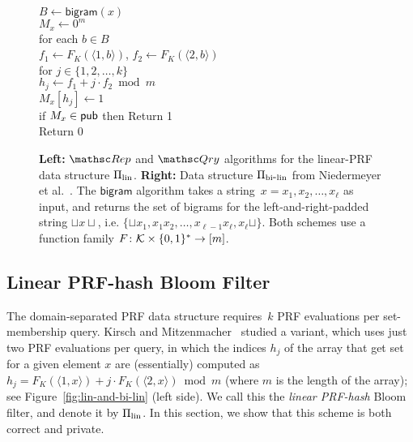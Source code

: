 \begin{figure}[tp]
{\medskip
{}\\
$B \gets \mathsf{bigram}(x)$\\
$M_x \gets 0^m$\\
for each $b \in B$\\
\nudge $f_1 \gets F_{K}(\langle 1,b \rangle)$, $f_2 \gets F_{K}(\langle 2,b \rangle)$\\
\nudge for $j \in \{1, 2, \ldots, k\}$\\
\nudge\nudge $h_j \gets f_1+j\cdot f_2 \bmod m$\\
\nudge\nudge $M_x[h_j] \gets 1$\\
if $M_x \in {\sf pub}$ then Return 1 \\
Return 0
}
\caption{{\bf Left:} $\Rep$ and $\Qry$ algorithms for the linear-PRF
  data structure $\Pi_{\mathrm{lin}}$. {\bf Right:}
Data structure $\Pi_{\mathrm{bi}\mbox{-}\mathrm{lin}}$ from Niedermeyer et
al.~\cite{niedermeyer2014cryptanalysis}.  The $\mathsf{bigram}$
algorithm takes a string~$x=x_1,x_2,\ldots,x_\ell$ as input, and
returns the set of bigrams for the left-and-right-padded string
$\sqcup x \sqcup$, i.e. $\{\sqcup x_1,
x_1x_2,\ldots,x_{\ell-1}x_\ell,x_\ell\sqcup\}$. Both schemes use a
function family $F\colon {\cal K} \times \{0,1\}^* \to [m]$.
}\label{fig:lin-and-bi-lin} \label{fig:niedermeyer}
\end{figure}

\subsection{Linear PRF-hash Bloom Filter }


The domain-separated PRF data structure requires~$k$ PRF evaluations
per set-membership query.  Kirsch and
Mitzenmacher~\cite{kirsch2006less} studied a variant, which uses
just two PRF evaluations per query, in which the indices $h_j$ of
the array that get set for a given element $x$ are (essentially)
computed as $h_j = F_K(\langle 1,x \rangle) + j\cdot F_K(\langle 2,x
\rangle) \bmod m$ (where $m$ is the length of the array); see
Figure~\ref{fig:lin-and-bi-lin} (left side).
We call this the \emph{linear PRF-hash} Bloom filter, and denote it
by $\Pi_{\mathrm{lin}}$.  In this section, we show that this
scheme is both correct and private.

